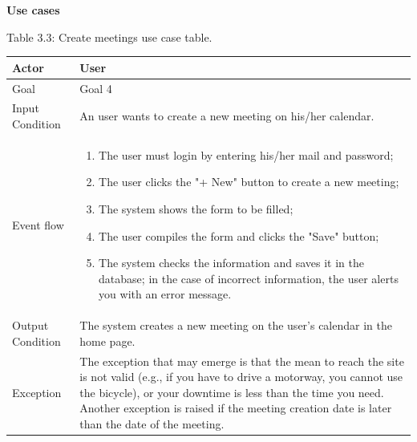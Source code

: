 \documentclass{article}
\begin{document}
	\bigskip
	\noindent
	\textbf{Use cases} \\
	
	\begin{center}
		Table 3.3: Create meetings use case table.
		
		\bigskip
    		\begin{tabular}{p{}|p{}}
   		 	\hline
    			Actor & User \\ \hline
    			Goal & Goal 4 \\ \hline
    			Input Condition & An user wants to create a new meeting on his/her calendar.\\ \hline
    			Event flow & 
			\begin{enumerate}
  				\item The user must login by entering his/her mail and password;
  				\item The user clicks the "+ New" button to create a new meeting;
  				\item The system shows the form to be filled;
  				\item The user compiles the form and clicks the "Save" button;
  				\item The system checks the information and saves it in the database; in the case of incorrect information, the user alerts you with an error message.
 			 \end{enumerate} \\ \hline
    			Output Condition & The system creates a new meeting on the user's calendar in the home page. \\ \hline
    			Exception & The exception that may emerge is that the mean to reach the site is not valid (e.g., if you have to drive a motorway, you cannot use the bicycle), or your downtime is less than the time you need. Another exception is raised if the meeting creation date is later than the date of the meeting. \\ \hline
    		\end{tabular}
	\end{center}
	
\end{document}
